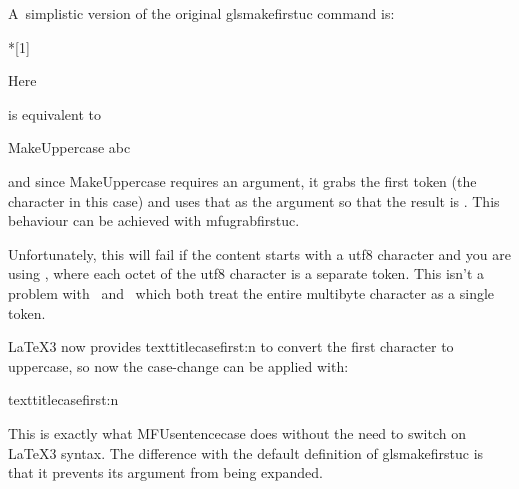 \documentclass[titlepage=false,oneside,
 fontsize=12pt,captions=tableheading]{scrbook}
\begin{document}
A~simplistic version of the original \gls{glsmakefirstuc} command is:
\begin{codebox}
*[1]
\end{codebox}
Here
\begin{codebox}
\end{codebox}
is equivalent to
\begin{codebox}
\gls{MakeUppercase} abc
\end{codebox}
and since \gls{MakeUppercase} requires an argument, it grabs the
first token (the character  in this case) and uses that as the
argument so that the result is . This behaviour can be
achieved with \gls{mfugrabfirstuc}.

Unfortunately, this will fail if the content starts with a \gls{utf8}
character and you are using \pdfLaTeX, where each octet of the
\gls{utf8} character is a separate token. This isn't a problem 
with \XeLaTeX\ and \LuaLaTeX\ which both treat the entire multibyte
character as a single token.

\LaTeX3 now provides \gls{texttitlecasefirst:n}
to convert the first character to uppercase, so now the
case-change can be applied with:
\begin{codebox}
\gls{texttitlecasefirst:n}
\end{codebox}
This is exactly what \gls{MFUsentencecase} does without the need to
switch on \LaTeX3 syntax. The difference with the default definition
of \gls{glsmakefirstuc} is that it prevents its argument from being
expanded.

\backmatter
\printterms
\printsummary
\printuserguideindex
\end{document}
